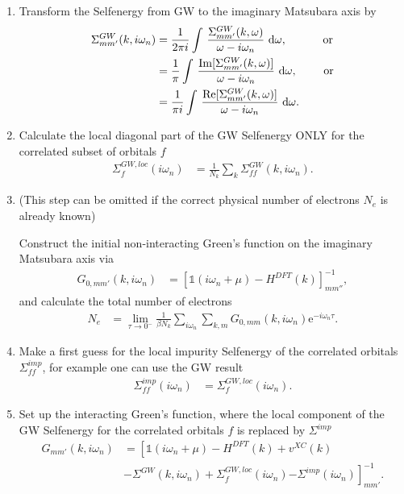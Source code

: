 \documentclass[12pt,a4paper]{scrartcl}
\numberwithin{equation}{subsection}
\newcommand{\GF}{Green's function}
\newcommand{\unity}{\mathds{1}}
\begin{document}
\begin{enumerate}

\item Transform the Selfenergy from GW to the imaginary Matsubara axis by
\begin{align}
\Sigma^{GW}_{mm'}(k,i\omega_n)
&= \frac{1}{2\pi i} \int \, \frac{\Sigma^{GW}_{mm'}(k,\omega)}{\omega - i\omega_n}\ \mathrm{d}\omega , \mbox{\hspace{1cm} or}\\
&= \frac{1}{\pi} \int \, \frac{\mathrm{Im}[\Sigma^{GW}_{mm'}(k,\omega)]}{\omega - i\omega_n} \ \mathrm{d}\omega , \mbox{\hspace{0.7cm} or} \\
&= \frac{1}{\pi i} \int \, \frac{\mathrm{Re}[\Sigma^{GW}_{mm'}(k,\omega)]}{\omega - i\omega_n} \ \mathrm{d}\omega .
\end{align}

\item Calculate the local diagonal part of the GW Selfenergy ONLY for the correlated subset of orbitals $f$
\begin{align}
 \Sigma^{GW,loc}_{f}(i\omega_n)
 &= \frac{1}{N_k}\sum_k \Sigma^{GW}_{ff}(k,i\omega_n).
\end{align}


\item (This step can be omitted if the correct physical number of electrons $N_e$ is already known)
 
Construct the initial non-interacting {\GF} on the imaginary Matsubara axis via
\begin{align}
   G_{0,mm'}(k,i\omega_n) 
 &= \left[ \unity(i\omega_n +\mu) -H^{DFT}(k)   \right]^{-1}_{mm''},
\end{align}
 and calculate the total number of electrons
\begin{align}
  N_e
 &= \lim_{\tau\rightarrow 0^-} \frac{1}{\beta N_k} 
                \sum_{i\omega_n}\sum_{k,m}G_{0,mm}(k,i\omega_n) \mathrm{e}^{-i\omega_n\tau}.
\end{align}

\item Make a first guess for the local impurity Selfenergy of the correlated
orbitals $\Sigma^{imp}_{ff}$, for example one can use the GW result
\begin{align}
 \Sigma^{imp}_{ff}(i\omega_n)
 &=  \Sigma^{GW,loc}_{f}(i\omega_n).
\end{align}

\item Set up the interacting {\GF}, where the local component of the GW
Selfenergy for the correlated orbitals $f$ is replaced by $\Sigma^{imp}$
\begin{align}
 G_{mm'}(k,i\omega_n) 
 &= \left[ \unity(i\omega_n+\mu ) -H^{DFT}(k) + v^{XC}(k) \right.\\
          &- \Sigma^{GW}(k,i\omega_n) 
          + \Sigma^{GW,loc}_f(i\omega_n)
          \left. - \Sigma^{imp}(i\omega_n) \right]^{-1}_{mm'}.
\end{align}


\end{enumerate}
\end{document}
